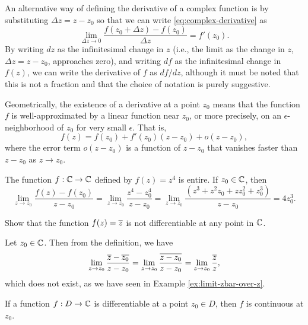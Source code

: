 An alternative way of defining the derivative of a complex function is by substituting \(\Delta z = z - z_0\) so that we can write
\eqref{eq:complex-derivative} as
\[
    \lim_{\Delta z \to 0} \frac{f(z_0 + \Delta z) - f(z_0)}{\Delta z} = f'(z_0).
    \label{eq:complex-derivative-delta-z}
\]
By writing \(dz\) as the infinitesimal change in \(z\) (i.e., the limit as the change in \(z\), \(\Delta z = z - z_0\), approaches zero), and writing \(df\) as the infinitesimal change in \(f(z)\), we can write the derivative of \(f\) as \(df/dz\), although it must be noted that this is not a fraction and that the choice of notation is purely suggestive.

Geometrically, the existence of a derivative at a point \(z_0\) means that the function \(f\) is well-approximated by a linear function near \(z_0\), or more precisely, on an \(\epsilon\)-neighborhood of \(z_0\) for very small \(\epsilon\). That is,
\[
    f(z) = f(z_0) + f'(z_0)(z - z_0) + o(z - z_0),
\]
where the error term \(o(z - z_0)\) is a function of \(z - z_0\) that vanishes faster than \(z - z_0\) as \(z \to z_0\).

\begin{example}
    The function \(f : \mathbb{C} \to \mathbb{C}\) defined by \(f(z) = z^4\) is entire. If \(z_0 \in \mathbb{C}\), then
    \[
        \lim_{z \to z_0} \frac{f(z) - f(z_0)}{z - z_0} = \lim_{z \to z_0} \frac{z^4 - z_0^4}{z - z_0} = \lim_{z \to z_0} \frac{(z^3 + z^2z_0 + zz_0^2 + z_0^3)}{z - z_0} = 4z_0^3.
    \]
\end{example}

\begin{example}
    Show that the function \(f(z) = \overline{z}\) is not differentiable at any point in \(\mathbb{C}\).

    \begin{solution}
        Let \(z_0 \in \mathbb{C}\). Then from the definition, we have
        \[
            \lim_{z \to z_0} \frac{\overline{z} - \overline{z_0}}{z - z_0} = \lim_{z \to z_0} \frac{\overline{z - z_0}}{z - z_0} = \lim_{z \to z_0} \frac{\overline{z}}{z},
        \]
        which does not exist, as we have seen in Example \ref{ex:limit-zbar-over-z}.
    \end{solution}
\end{example}

\begin{theorem}
    If a function \(f : D \to \mathbb{C}\) is differentiable at a point \(z_0 \in D\), then \(f\) is continuous at \(z_0\).
    \label{thm:differentiability-implies-continuity}
\end{theorem}

